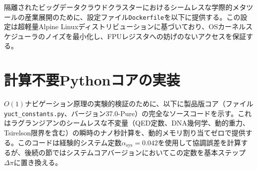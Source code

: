 \documentclass[11pt,a4paper]{article}
\begin{document}
	
	隔離されたビッグデータクラウドクラスターにおけるシームレスな学際的メタツールの産業展開のために、設定ファイル\texttt{Dockerfile}を以下に提供する。この設定は超軽量Alpine Linuxディストリビューションに基づいており、OSカーネルスケジューラのノイズを最小化し、FPUレジスタへの妨げのないアクセスを保証する。
	
	
	
	\section{計算不要Pythonコアの実装}
	\(O(1)\)ナビゲーション原理の実験的検証のために、以下に製品版コア（ファイル\texttt{yuct\_constants.py}、バージョン37.0-Pure）の完全なソースコードを示す。これはラグランジアンのシームレスな不変量（QED定数、DNA幾何学、動的重力、Tsirelson限界を含む）の瞬時のナノ秒計算を、動的メモリ割り当てゼロで提供する。このコードは経験的システム定数\(\alpha_{\text{sys}} = 0.042\)を使用して協調誤差を計算するが、後続の節ではシステムコアバージョンにおいてこの定数を基本ステップ\(\Delta\pi\)に置き換える。
	
\end{document}
